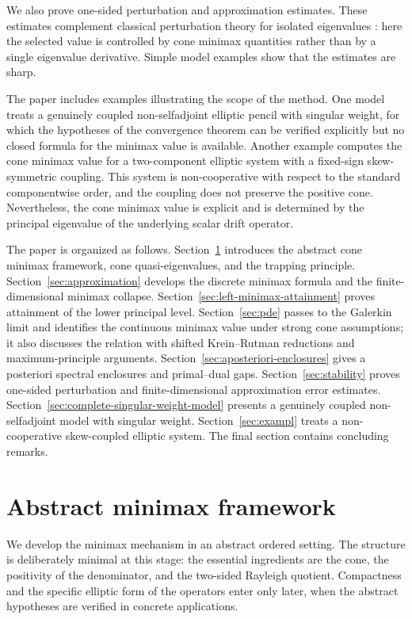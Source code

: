 \documentclass[preprint,10pt]{elsarticle}
\theoremstyle{plain}
\theoremstyle{definition}
\theoremstyle{remark}
\begin{document}
We also prove one-sided perturbation and approximation estimates. These
estimates complement classical perturbation theory for isolated eigenvalues
\cite{Kato}: here the selected value is controlled by cone minimax quantities
rather than by a single eigenvalue derivative. Simple model examples show
that the estimates are sharp.

The paper includes examples illustrating the scope of the method. One model
treats a genuinely coupled non-selfadjoint elliptic pencil with singular
weight, for which the hypotheses of the convergence theorem can be verified
explicitly but no closed formula for the minimax value is available. Another
example computes the cone minimax value for a two-component elliptic system
with a fixed-sign skew-symmetric coupling. This system is non-cooperative with
respect to the standard componentwise order, and the coupling does not
preserve the positive cone. Nevertheless, the cone minimax value is explicit
and is determined by the principal eigenvalue of the underlying scalar drift
operator.

The paper is organized as follows. Section~\ref{sec:abstract} introduces the
abstract cone minimax framework, cone quasi-eigenvalues, and the trapping
principle. Section~\ref{sec:approximation} develops the discrete minimax
formula and the finite-dimensional minimax collapse. Section~\ref{sec:left-minimax-attainment}
proves attainment of the lower principal level. Section~\ref{sec:pde} passes
to the Galerkin limit and identifies the continuous minimax value under strong
cone assumptions; it also discusses the relation with shifted Krein--Rutman
reductions and maximum-principle arguments. Section~\ref{sec:aposteriori-enclosures}
gives a posteriori spectral enclosures and primal--dual gaps.
Section~\ref{sec:stability} proves one-sided perturbation and
finite-dimensional approximation error estimates.
Section~\ref{sec:complete-singular-weight-model} presents a genuinely coupled
non-selfadjoint model with singular weight. Section~\ref{sec:exampl} treats a
non-cooperative skew-coupled elliptic system. The final section contains
concluding remarks.

\section{Abstract minimax framework}
\label{sec:abstract}

We develop the minimax mechanism in an abstract ordered setting. The
structure is deliberately minimal at this stage: the essential ingredients
are the cone, the positivity of the denominator, and the two-sided Rayleigh
quotient. Compactness and the specific elliptic form of the operators enter
only later, when the abstract hypotheses are verified in concrete
applications.
\end{document}
